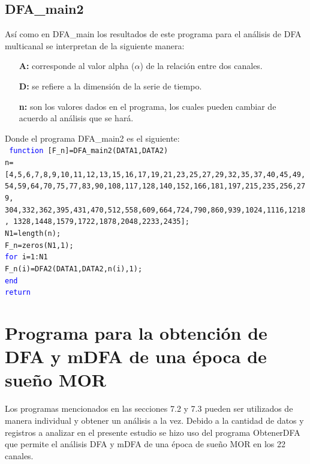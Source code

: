 \documentclass[letterpaper,titlepage,12pt,draft]{report}
\begin{document}
\subsection{DFA\_main2}

As\'i como en DFA\_main los resultados de este programa para el an\'alisis de DFA multicanal se interpretan de la siguiente manera:
\begin{itemize}
\item[\bf A:] corresponde al valor alpha ($\alpha$) de la relaci\'on entre dos canales.
\item[\bf D:] se refiere a la dimensi\'on de la serie de tiempo.
\item[\bf n:] son los valores dados en el programa, los cuales pueden cambiar de acuerdo al an\'alisis que se har\'a.
\end{itemize}

Donde el programa DFA\_main2 es el siguiente:\\

{\tt \setlength{\parindent}{0pt} \textcolor{blue}{function} [F\_n]=DFA\_main2(DATA1,DATA2)\\
n=[4,5,6,7,8,9,10,11,12,13,15,16,17,19,21,23,25,27,29,32,35,37,40,45,49,
54,59,64,70,75,77,83,90,108,117,128,140,152,166,181,197,215,235,256,279,
304,332,362,395,431,470,512,558,609,664,724,790,860,939,1024,1116,1218,
1328,1448,1579,1722,1878,2048,2233,2435];\\%
N1=length(n);\\
F\_n=zeros(N1,1);\\
\textcolor{blue}{for} i=1:N1\\
F\_n(i)=DFA2(DATA1,DATA2,n(i),1);\\
\textcolor{blue}{end}\\
\textcolor{blue}{return}\\
}

\section{Programa para la obtenci\'on de DFA y mDFA de una \'epoca de sue\~no MOR}

Los programas mencionados en las secciones 7.2 y 7.3 pueden ser utilizados de manera individual y obtener un an\'alisis a la vez. Debido a la cantidad de datos y registros a analizar en el presente estudio se hizo uso del programa ObtenerDFA que permite el an\'alisis DFA y mDFA de una \'epoca de sue\~no MOR en los 22 canales.\\
\end{document}
